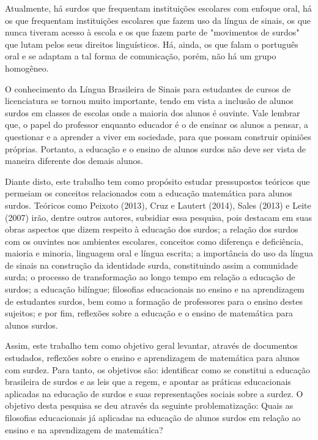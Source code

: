 \documentclass[brasil]{abnt}
\begin{document}
	Atualmente, há surdos que frequentam instituições escolares com enfoque oral, há os que frequentam instituições escolares que fazem uso da língua de sinais, os que nunca tiveram acesso à escola e os 
	que fazem parte de "movimentos de surdos" que lutam pelos seus direitos linguísticos. Há, ainda, os que falam o português oral e se adaptam a tal forma de comunicação, porém, não há um grupo homogêneo. 	
	
	O conhecimento da Língua Brasileira de Sinais para estudantes de cursos de licenciatura se tornou muito importante, tendo em vista a inclusão de alunos surdos em classes de escolas onde a maioria dos alunos é ouvinte. 
	Vale lembrar que, o papel do professor enquanto educador é o de ensinar os alunos a pensar, a questionar e a aprender a viver em sociedade, para que possam construir opiniões próprias. Portanto, a educação e o ensino de
	alunos surdos não deve ser vista de maneira diferente dos demais alunos.
	
	Diante disto, este trabalho tem como propósito estudar pressupostos 
	teóricos que permeiam os conceitos relacionados com a educação 
	matemática para alunos surdos. Teóricos como Peixoto (2013), Cruz 
	e Lautert (2014), Sales (2013) e Leite (2007) irão, dentre outros autores, subsidiar essa pesquisa, pois destacam em suas obras aspectos que dizem respeito à educação dos surdos; a relação dos surdos com os ouvintes nos ambientes 
	escolares, conceitos como diferença e deficiência, maioria e minoria, linguagem oral e língua escrita; a importância do uso da língua de sinais na construção da identidade surda, constituindo assim a comunidade
	surda; o processo de transformação ao longo tempo em relação a educação de surdos; a educação bilíngue; filosofias educacionais no ensino e na aprendizagem de estudantes surdos, bem como a formação de professores para 
	o ensino destes sujeitos; e por fim, reflexões sobre a educação e o ensino de matemática para alunos surdos. 
	
	Assim, este trabalho tem como objetivo geral levantar, através de documentos estudados, reflexões sobre o ensino e aprendizagem de matemática para alunos com surdez. 
	Para tanto, os objetivos são: identificar como se constitui a educação brasileira de surdos e as leis que a regem, e apontar as práticas educacionais aplicadas na educação de surdos e suas representações sociais sobre a 
	surdez. O objetivo desta pesquisa se deu através da seguinte problematização: Quais as filosofias educacionais já aplicadas na educação de alunos surdos em relação ao ensino e na aprendizagem de matemática?  
	
\end{document}
